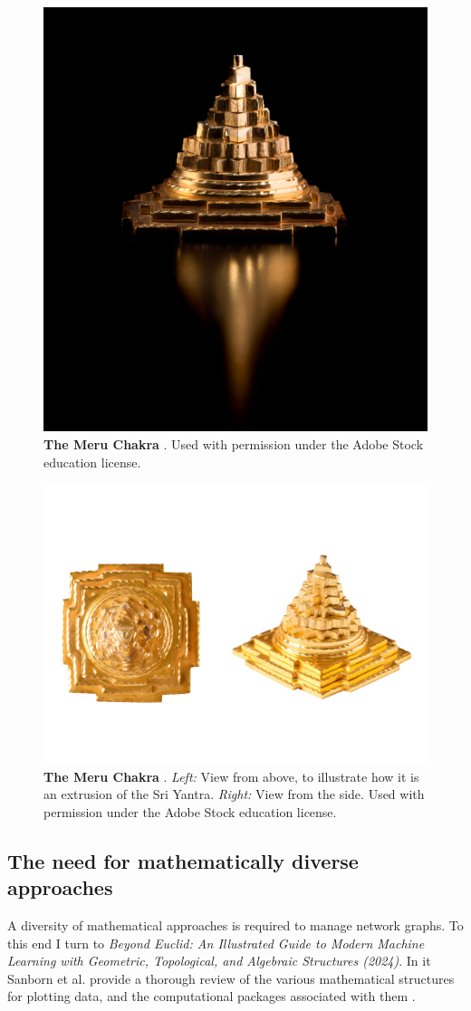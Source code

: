 \begin{figure}[h]
    \centering
    \includegraphics[width=0.5\linewidth]{figures/f7.png}
    \caption[The Meru Chakra]{\textbf{The Meru Chakra} \citep{fortton_pyramid_nodate}. Used with permission under the Adobe Stock education license.}
    \label{f7}
\end{figure}
\clearpage
{}

\begin{figure}[h]
    \centering
    \includegraphics[width=0.5\linewidth]{figures/f8.png}
    \caption[The Meru Chakra ]{\textbf{The Meru Chakra} \citep{fortton_golden_nodate}. \textit{Left:} View from above, to illustrate how it is an extrusion of the Sri Yantra. \textit{Right:} View from the side. Used with permission under the Adobe Stock education license.}
    \label{f8}
\end{figure}


\subsection{The need for mathematically diverse approaches}
A diversity of mathematical approaches is required to manage network graphs. To this end I turn to \textit{Beyond Euclid: An Illustrated Guide to Modern Machine Learning with Geometric, Topological, and Algebraic Structures (2024)}. In it Sanborn et al. provide a thorough review of the various mathematical structures for plotting data, \citep[p. 6]{sanborn_beyond_2024} and the computational packages associated with them \citep[p. 28]{sanborn_beyond_2024}.

